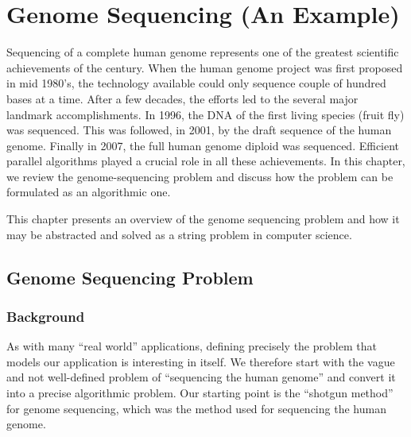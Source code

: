 \chapter{Genome Sequencing (An Example)}
\label{ch:genome}

\begin{cluster}
\label{grp:prmbl:genome::sequencing}

\begin{preamble}
\label{prmbl:genome::sequencing}
Sequencing of a complete human genome represents one of the greatest
scientific achievements of the century.
When the human genome project was first proposed in mid 1980's, the
technology available could only sequence couple of hundred bases at a
time.
After a few decades, the efforts led to the several major landmark
accomplishments.
In 1996, the DNA of the first living species (fruit fly) was sequenced. 
This was followed, in 2001, by the draft sequence of the human genome.
Finally in 2007, the full human genome diploid was sequenced.
Efficient parallel algorithms played a crucial role in all these
achievements.  In this chapter, we review the genome-sequencing
problem and discuss how the problem can be formulated as an
algorithmic one.

This chapter presents an overview of the genome sequencing problem and how it may be abstracted and solved as a string problem in computer science.

\end{preamble}
\end{cluster}


\section{Genome Sequencing Problem}
\label{sec:genome::prob}


\subsection{Background}
\label{sec:genome::background}

\begin{cluster}
\label{grp:grm:genome::real}

\begin{gram}
\label{grm:genome::real}
As with many ``real world'' applications, defining precisely the
problem that models our application is interesting in itself.  
We
therefore start with the vague and not well-defined problem of
``sequencing the human genome'' and convert it into a precise
algorithmic problem.  
Our starting point is the ``shotgun method'' for
genome sequencing, which was the method used for sequencing the human
genome.

\end{gram}
\end{cluster}

